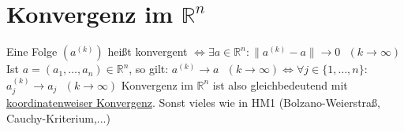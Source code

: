 \section{Konvergenz im $\mathbb{R}^n$}
Eine Folge $(a^{(k)})$ heißt konvergent $\Leftrightarrow \exists a \in \mathbb{R}^n: \lVert a^{(k)} - a \rVert \to 0 \text{ } (k \to \infty)$
Ist $a=(a_1, \ldots, a_n) \in \mathbb{R}^n$, so gilt: $a^{(k)} \to a \text{ } (k \to \infty) \Leftrightarrow \forall j \in \{ 1, \ldots, n\}:$
$a_j^{(k)} \to a_j \text{ } (k \to \infty)$ Konvergenz im $\mathbb{R}^n$ ist also gleichbedeutend mit \underline{koordinatenweiser Konvergenz}.
Sonst vieles wie in HM1 (Bolzano-Weierstraß, Cauchy-Kriterium,...)
